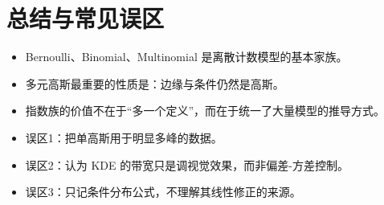 \documentclass[11pt]{article}
\begin{document}
\section{总结与常见误区}
\begin{itemize}[leftmargin=1.6em]
  \item Bernoulli、Binomial、Multinomial 是离散计数模型的基本家族。
  \item 多元高斯最重要的性质是：边缘与条件仍然是高斯。
  \item 指数族的价值不在于“多一个定义”，而在于统一了大量模型的推导方式。
  \item 误区1：把单高斯用于明显多峰的数据。
  \item 误区2：认为 KDE 的带宽只是调视觉效果，而非偏差-方差控制。
  \item 误区3：只记条件分布公式，不理解其线性修正的来源。
\end{itemize}
\end{document}
